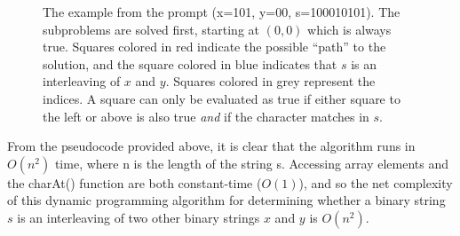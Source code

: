 \documentclass[11pt]{article}
\begin{document}
\begin{figure}[htbp!]
\centering
{}
\caption{The example from the prompt (x=101, y=00, s=100010101). The subproblems are solved first, starting at $(0,0)$ which is always true. Squares colored in red indicate the possible ``path'' to the solution, and the square colored in blue indicates that $s$ is an interleaving of $x$ and $y$. Squares colored in grey represent the indices. A square can only be evaluated as true if either square to the left or above is also true \textit{and} if the character matches in $s$.}
\end{figure}

From the pseudocode provided above, it is clear that the algorithm runs in $O(n^2)$ time, where n is the length of the string s. Accessing array elements and the charAt() function are both constant-time ($O(1)$), and so the net complexity of this dynamic programming algorithm for determining whether a binary string $s$ is an interleaving of two other binary strings $x$ and $y$ is $O(n^2)$.
\end{document}
